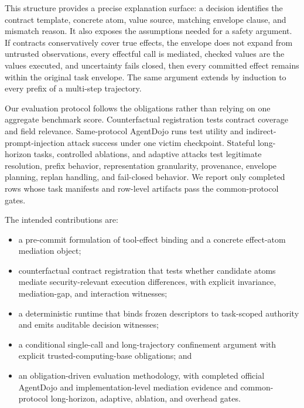 This structure provides a precise explanation surface: a decision identifies the contract template, concrete atom, value source, matching envelope clause, and mismatch reason. It also exposes the assumptions needed for a safety argument. If contracts conservatively cover true effects, the envelope does not expand from untrusted observations, every effectful call is mediated, checked values are the values executed, and uncertainty fails closed, then every committed effect remains within the original task envelope. The same argument extends by induction to every prefix of a multi-step trajectory.

Our evaluation protocol follows the obligations rather than relying on one aggregate benchmark score. Counterfactual registration tests contract coverage and field relevance. Same-protocol AgentDojo runs test utility and indirect-prompt-injection attack success under one victim checkpoint. Stateful long-horizon tasks, controlled ablations, and adaptive attacks test legitimate resolution, prefix behavior, representation granularity, provenance, envelope planning, replan handling, and fail-closed behavior. We report only completed rows whose task manifests and row-level artifacts pass the common-protocol gates.

The intended contributions are:
\begin{itemize}[leftmargin=*]
  \item a pre-commit formulation of tool-effect binding and a concrete effect-atom mediation object;
  \item counterfactual contract registration that tests whether candidate atoms mediate security-relevant execution differences, with explicit invariance, mediation-gap, and interaction witnesses;
  \item a deterministic runtime that binds frozen descriptors to task-scoped authority and emits auditable decision witnesses;
  \item a conditional single-call and long-trajectory confinement argument with explicit trusted-computing-base obligations; and
  \item an obligation-driven evaluation methodology, with completed official AgentDojo and implementation-level mediation evidence and common-protocol long-horizon, adaptive, ablation, and overhead gates.
\end{itemize}
